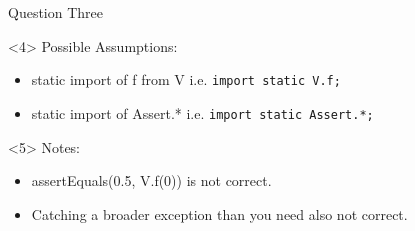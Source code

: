 \documentclass[12]{beamer}
\begin{document}
\begin{frame}[t, fragile]{Question Three}
\begin{onlyenv}
\begin{java}
{{    }
}
\end{java}

\end{onlyenv}
\begin{onlyenv}<4>
Possible Assumptions:
\begin{itemize}
\item static import of f from V i.e. \texttt{import static V.f;}
\item static import of Assert.* i.e. \texttt{import static Assert.*;}
\end{itemize}
\end{onlyenv}

\begin{onlyenv}<5>
Notes:
\begin{itemize}
\item assertEquals(0.5, V.f(0)) is not correct. 
\item Catching a broader exception than you need also not correct.
\end{itemize}
\end{onlyenv}

\end{frame}
\end{document}
